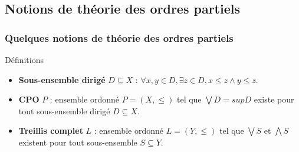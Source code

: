 \documentclass{beamer}
\begin{document}
\subsection{Notions de théorie des ordres partiels}

\begin{frame}
\frametitle{Quelques notions de théorie des ordres partiels}

\begin{block}{Définitions}
\begin{itemize}
\item \textbf{Sous-ensemble dirigé} $D \subseteq X$ : %
$\forall x, y \in D, \exists z \in D, x \leq z \wedge y \leq z$.
\item \textbf{CPO} $P$ : ensemble ordonné $P = (X, \leq)$ tel que $\bigvee D = sup D$ existe pour tout sous-ensemble dirigé $D \subseteq X$.

\item \textbf{Treillis complet} $L$ : ensemble ordonné $L = (Y, \leq)$ tel que $\bigvee S$ et $\bigwedge S$ existent pour tout sous-ensemble $S \subseteq Y$.
\end{itemize}
\end{block}


\end{frame}
\end{document}
